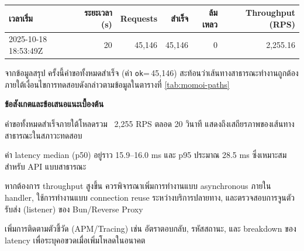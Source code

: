 \begin{table}[htbp]
    \centering
    \caption{}
    \label{tab:momoi-summary}
    \begin{tabular}{lrrrrr}
        \hline
    เวลาเริ่ม & ระยะเวลา (s) & Requests & สำเร็จ & ล้มเหลว & Throughput (RPS) \\
        \hline
    2025-10-18 18:53:49Z & 20 & 45{,}146 & 45{,}146 & 0 & 2{,}255.16 \\
        \hline
    \end{tabular}
\end{table}

\hspace*{1.5em}
จากข้อมูลสรุป ครั้งนี้คำขอทั้งหมดสำเร็จ (ค่า \texttt{ok}=\,45{,}146) สะท้อนว่าเส้นทางสาธารณะทำงานถูกต้องภายใต้เงื่อนไขการทดสอบดังกล่าวตามข้อมูลในตารางที่ \ref{tab:momoi-paths}

\begin{table}[htbp]
    \centering
    \caption{}
    \label{tab:momoi-paths}
\end{table}

\hspace*{1.5em}
\textbf{ข้อสังเกตและข้อเสนอแนะเบื้องต้น}
\begin{mycustomitem}
    \item คำขอทั้งหมดสำเร็จภายใต้โหลดรวม ~2{,}255 RPS ตลอด 20 วินาที แสดงถึงเสถียรภาพของเส้นทางสาธารณะในสภาวะทดสอบ
    \item ค่า latency median (p50) อยู่ราว 15.9–16.0 ms และ p95 ประมาณ 28.5 ms ซึ่งเหมาะสมสำหรับ API แบบสาธารณะ
    \item หากต้องการ throughput สูงขึ้น ควรพิจารณาเพิ่มการทำงานแบบ asynchronous ภายใน handler, ใช้การทำงานแบบ connection reuse ระหว่างบริการปลายทาง, และตรวจสอบการจูนตัวรับส่ง (listener) ของ Bun/Reverse Proxy
    \item เพิ่มการติดตามตัวชี้วัด (APM/Tracing) เช่น อัตราตอบกลับ, รหัสสถานะ, และ breakdown ของ latency เพื่อระบุคอขวดเมื่อเพิ่มโหลดในอนาคต
\end{mycustomitem}


